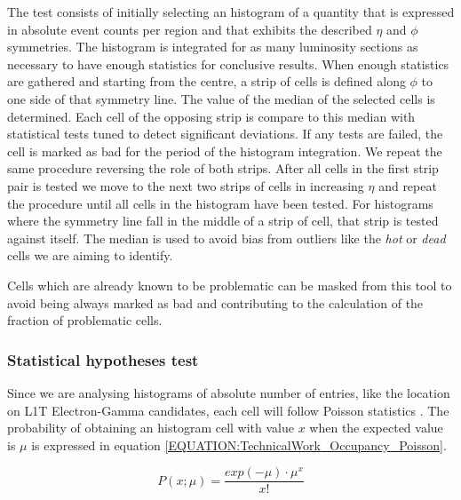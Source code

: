 The test consists of initially selecting an histogram of a quantity that is expressed in absolute event counts per region and that exhibits the described $\eta$ and $\phi$ symmetries. The histogram is integrated for as many luminosity sections as necessary to have enough statistics for conclusive results. When enough statistics are gathered and starting from the centre, a strip of cells is defined along $\phi$ to one side of that symmetry line. The value of the median of the selected cells is determined. Each cell of the opposing strip is compare to this median with statistical tests tuned to detect significant deviations. If any tests are failed, the cell is marked as bad for the period of the histogram integration. We repeat the same procedure reversing the role of both strips. After all cells in the first strip pair is tested we move to the next two strips of cells in increasing $\eta$ and repeat the procedure until all cells in the histogram have been tested. For histograms where the symmetry line fall in the middle of a strip of cell, that strip is tested against itself. The median is used to avoid bias from outliers like the \textit{hot} or \textit{dead} cells we are aiming to identify. 

Cells which are already known to be problematic can be masked from this tool to avoid being always marked as bad and contributing to the calculation of the fraction of problematic cells.

\subsubsection{Statistical hypotheses test}


Since we are analysing histograms of absolute number of entries, like the location on \gls{L1T} Electron-Gamma candidates, each cell will follow Poisson statistics \cite{BOOK:AppliedStatisticsAndProbabilityforEngineers}. The probability of obtaining an histogram cell with value $x$ when the expected value is $\mu$ is expressed in equation \ref{EQUATION:TechnicalWork_Occupancy_Poisson}.

\begin{equation}
P(x;\mu)=\frac{exp(-\mu) \cdot \mu^{x}}{x!}
\label{EQUATION:TechnicalWork_Occupancy_Poisson}
\end{equation}

